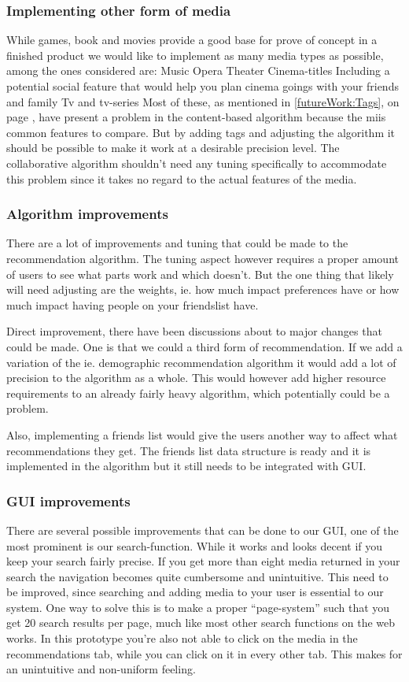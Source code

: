 \subsubsection{Implementing other form of media}
While games, book and movies provide a good base for prove of concept in a finished product we would like to implement as many media types as possible, among the ones considered are:
Music
Opera
Theater
Cinema-titles
Including a potential social feature that would help you plan cinema goings with your friends and family
Tv and tv-series
Most of these, as mentioned in \ref{futureWork:Tags}, on page \pageref{futureWork:Tags}, have present a problem in the content-based algorithm because the miis common features to compare. But by adding tags and adjusting the algorithm it should be possible to make it work at a desirable precision level. The collaborative algorithm shouldn’t need any tuning specifically to accommodate this problem since it takes no regard to the actual features of the media.

\subsubsection{Algorithm improvements}
There are a lot of improvements and tuning that could be made to the recommendation algorithm. The tuning aspect however requires a proper amount of users to see what parts work and which doesn’t. But the one thing that likely will need adjusting are the weights, ie. how much impact preferences have or how much impact having people on your friendslist have.

Direct improvement, there have been discussions about to major changes that could be made. One is that we could a third form of recommendation. If we add a variation of the ie. demographic recommendation algorithm it would add a lot of precision to the algorithm as a whole. This would however add higher resource requirements to an already fairly heavy algorithm, which potentially could be a problem.

Also, implementing a friends list would give the users another way to affect what recommendations they get. The friends list data structure is ready and it is implemented in the algorithm but it still needs to be integrated with GUI.

\subsubsection{GUI improvements}
There are several possible improvements that can be done to our GUI, one of the most prominent is our search-function. While it works and looks decent if you keep your search fairly precise. If you get more than eight media returned in your search the navigation becomes quite cumbersome and unintuitive. This need to be improved, since searching and adding media to your user is essential to our system. One way to solve this is to make a proper “page-system” such that you get 20 search results per page, much like most other search functions on the web works.
In this prototype you’re also not able to click on the media in the recommendations tab, while you can click on it in every other tab. This makes for an unintuitive and non-uniform feeling.

